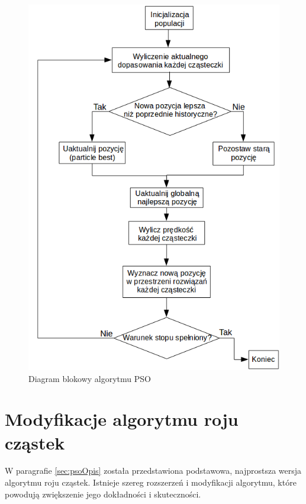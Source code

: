 \clearpage

\begin{figure}[H]
\begin{center} 
\includegraphics[scale=0.55]{tresc/pics/psoDiagram.png}
\caption{Diagram blokowy algorytmu PSO}
\label{fig:psoDiagram}
\end{center}
\end{figure}


\section{Modyfikacje algorytmu roju cząstek}
\label{sec:psoModyfikacje}
W paragrafie \ref{sec:psoOpis} została przedstawiona podstawowa, najprostsza wersja algorytmu roju cząstek. Istnieje szereg rozszerzeń i modyfikacji algorytmu, które powodują zwiększenie jego dokładności i skuteczności.



